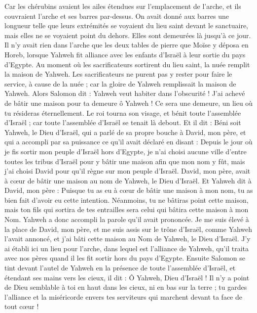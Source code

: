 \begin{multicols}{2}
Car les chérubins avaient les ailes étendues sur l’emplacement de l'arche, et ils couvraient l'arche et ses barres par-dessus.
On avait donné aux barres une longueur telle que leurs extrémités se voyaient du lieu saint devant le sanctuaire, mais elles ne se voyaient point du dehors. Elles sont demeurées là jusqu'à ce jour.
Il n'y avait rien dans l'arche que les deux tables de pierre que Moïse y déposa en Horeb, lorsque Yahweh fit alliance avec les enfants d'Israël à leur sortie du pays d'Egypte.
Au moment où les sacrificateurs sortirent du lieu saint, la nuée remplit la maison de Yahweh.
Les sacrificateurs ne purent pas y rester pour faire le service, à cause de la nuée ; car la gloire de Yahweh remplissait la maison de Yahweh.
Alors Salomon dit : Yahweh veut habiter dans l'obscurité !
J'ai achevé de bâtir une maison pour ta demeure ô Yahweh ! Ce sera une demeure, un lieu où tu résideras éternellement.
Le roi tourna son visage, et bénit toute l'assemblée d'Israël ; car toute l'assemblée d'Israël se tenait là debout.
Et il dit : Béni soit Yahweh, le Dieu d'Israël, qui a parlé de sa propre bouche à David, mon père, et qui a accompli par sa puissance ce qu’il avait déclaré en disant :
Depuis le jour où je fis sortir mon peuple d'Israël hors d'Egypte, je n'ai choisi aucune ville d'entre toutes les tribus d'Israël pour y bâtir une maison afin que mon nom y fût, mais j'ai choisi David pour qu’il règne sur mon peuple d'Israël.
David, mon père, avait à cœur de bâtir une maison au nom de Yahweh, le Dieu d'Israël.
Et Yahweh dit à David, mon père : Puisque tu as eu à cœur de bâtir une maison à mon nom, tu as bien fait d’avoir eu cette intention.
Néanmoins, tu ne bâtiras point cette maison, mais ton fils qui sortira de tes entrailles sera celui qui bâtira cette maison à mon Nom.
Yahweh a donc accompli la parole qu'il avait prononcée. Je me suis élevé à la place de David, mon père, et me suis assis sur le trône d'Israël, comme Yahweh l’avait annoncé, et j'ai bâti cette maison au Nom de Yahweh, le Dieu d'Israël.
J'y ai établi ici un lieu pour l'arche, dans lequel est l'alliance de Yahweh, qu'il traita avec nos pères quand il les fit sortir hors du pays d'Egypte.
Ensuite Salomon se tint devant l'autel de Yahweh en la présence de toute l'assemblée d'Israël, et étendant ses mains vers les cieux,
il dit : Ô Yahweh, Dieu d'Israël ! Il n'y a point de Dieu semblable à toi en haut dans les cieux, ni en bas sur la terre ; tu gardes l'alliance et la miséricorde envers tes serviteurs qui marchent devant ta face de tout cœur !

\end{multicols}
